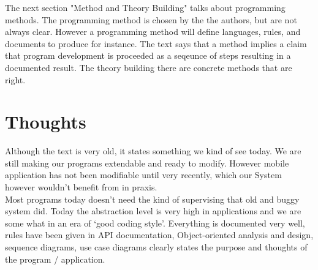 \documentclass[]{article}
\begin{document}
The next section "Method and Theory Building" talks about programming methods. The programming method is chosen by the the authors, but are not always clear. However a programming method will define languages, rules, and documents to produce for instance. The text says that a method implies a claim that program development is proceeded as a seqeunce of steps resulting in a documented result. The theory building there are concrete methods that are right.

\section*{Thoughts}
Although the text is very old, it states something we kind of see today. We are still making our programs extendable and ready to modify. However mobile application has not been modifiable until very recently, which our System however wouldn't benefit from in praxis. \\

Most programs today doesn't need the kind of supervising that old and buggy system did. Today the abstraction level is very high in applications and we are some what in an era of ‘good coding style’. Everything is documented very well, rules have been given in API documentation, Object-oriented analysis and design, sequence diagrams, use case diagrams clearly states the purpose and thoughts of the program / application.
\end{document}
